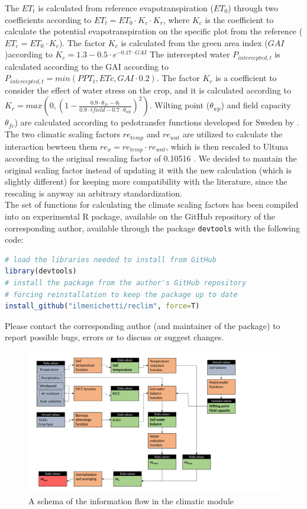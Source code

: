 \documentclass[review]{elsarticle}
\begin{document}
The $ET_t$ is calculated from reference evapotranspiration ($ET_0$) through two coefficients according to $ET_t=ET_0 \cdot K_c \cdot K_r$, where $K_c$ is the coefficient to calculate the potential evapotranspiration on the specific plot from the reference ($ET_c=ET_0 \cdot K_c$). The factor $K_c$ is calculated from the green area index ($GAI$)according to $K_c=1.3-0.5\cdot e^{-0.17\cdot GAI}$
The intercepted water $P_{intercepted, t}$ is calculated according to the GAI according to $P_{intercepted, t}=min(PPT_t, ETc, GAI\cdot0.2)$.
The factor $K_r$ is a coefficient to consider the effect of water stress on the crop, and it is calculated according to $K_r=max\left(0,\left(1-\frac{0.9\cdot \theta_{fc}-\theta_{t}}{0.9\cdot tfield-0.7\cdot \theta_{wp}}\right)^2\right)$.
Wilting point ($\theta_{wp}$) and field capacity $\theta_{fc}$) are calculated according to pedotransfer functions developed for Sweden by \cite{Katterer2006}.\\
The two climatic scaling factors $re_{temp}$ and $re_{wat}$ are utilized to calculate the interaction bewteen them $re_{x}=re_{temp}\cdot re_{wat}$, which is then rescaled to Ultuna according to the original rescaling factor of 0.10516 \cite{Andren1997}. We decided to mantain the original scaling factor instead of updating it with the new calculation (which is slightly different) for keeping more compatibility with the literature, since the rescaling is anyway an arbitrary standardization.\\
The set of functions for calculating the climate scaling factors has been compiled into an experimental R package, available on the GitHub repository of the corresponding author, available through the package \texttt{devtools} with the following code:
\begin{lstlisting}[language=R]
# load the libraries needed to install from GitHub
library(devtools)
# install the package from the author's GitHub repository
# forcing reinstallation to keep the package up to date
install_github("ilmenichetti/reclim", force=T) 
\end{lstlisting}
Please contact the corresponding author (and maintainer of the package) to report possible bugs, errors or to discuss or suggest changes. 

\begin{figure}[bt]
\centering
\includegraphics[width=\textwidth]{./Manuscript_plots/re_Clim_schema_reduced.png}
\caption{A schema of the information flow in the climatic module}
\label{figure:reclim}
\end{figure}
\end{document}
